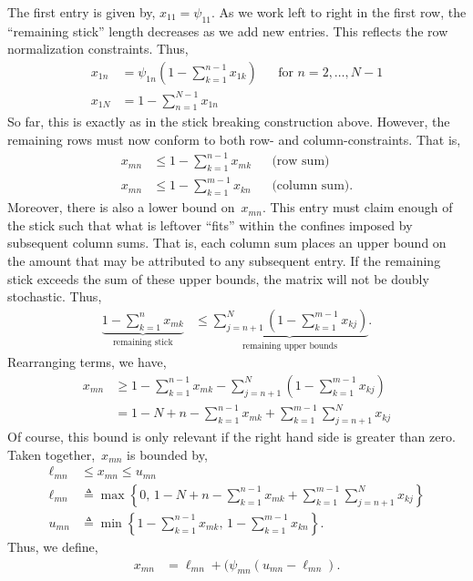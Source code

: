 \documentclass[twoside]{article}
\begin{document}
The first entry is given by, $x_{11} = \psi_{11}$.  As we work left to
right in the first row, the ``remaining stick'' length decreases as we
add new entries. This reflects the row normalization constraints.
Thus,
\begin{align}
  x_{1n} &= \psi_{1n} \left(1 - \sum_{k=1}^{n-1} x_{1k} \right)  & &  \text{for } n=2, \ldots, N-1\\
  x_{1N} &= 1 - \sum_{n=1}^{N-1} x_{1n}
\end{align}
So far, this is exactly as in the stick breaking construction
above. However, the remaining rows must now conform to both row- and
column-constraints. That is,
\begin{align}
x_{mn} &\leq 1- \sum_{k=1}^{n-1} x_{mk} & & \text{(row sum)} \\
x_{mn} &\leq 1- \sum_{k=1}^{m-1} x_{kn} & & \text{(column sum)}.
\end{align}
Moreover, there is also a lower bound on~$x_{mn}$. This entry must
claim enough of the stick such that what is leftover ``fits'' within
the confines imposed by subsequent column sums. That is, each column
sum places an upper bound on the amount that may be attributed to any
subsequent entry. If the remaining stick exceeds the sum of these
upper bounds, the matrix will not be doubly stochastic.  Thus,
\begin{align}
\underbrace{1 - \sum_{k=1}^n x_{mk}}_{\text{remaining stick}}
  &\leq \underbrace{\sum_{j=n+1}^N (1- \sum_{k=1}^{m-1} x_{kj})}_{
    \text{remaining upper bounds}}.
\end{align}
Rearranging terms, we have,
\begin{align}
x_{mn} &\geq 1- \sum_{k=1}^{n-1} x_{mk} - \sum_{j=n+1}^N (1- \sum_{k=1}^{m-1} x_{kj}) \\
&= 1 - N + n - \sum_{k=1}^{n-1} x_{mk}  +  \sum_{k=1}^{m-1} \sum_{j=n+1}^N x_{kj}
\end{align}
Of course, this bound is only relevant if the right hand side is greater than zero.
Taken together,~$x_{mn}$ is bounded by,
\begin{align}
\ell_{mn} &\leq x_{mn} \leq u_{mn} \\
\ell_{mn} &\triangleq \max \left \{0, \, 1 - N + n - \sum_{k=1}^{n-1} x_{mk}  +  \sum_{k=1}^{m-1} \sum_{j=n+1}^N x_{kj} \right \}
\\
u_{mn} &\triangleq 
\min \left \{1- \sum_{k=1}^{n-1} x_{mk}, \,
1- \sum_{k=1}^{m-1} x_{kn} \right\}.
\end{align}
Thus, we define,
\begin{align}
  x_{mn} &= \ell_{mn} + (\psi_{mn} (u_{mn} - \ell_{mn}).
\end{align}
\end{document}

